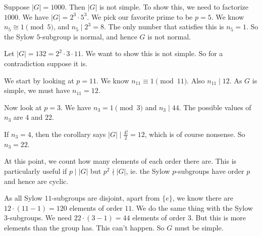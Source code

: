 \documentclass[a4paper]{article}
\begin{document}
\begin{eg}
  Suppose $|G| = 1000$. Then $|G|$ is not simple. To show this, we need to factorize $1000$. We have $|G| = 2^3 \cdot 5^3$. We pick our favorite prime to be $p = 5$. We know $n_5 \cong 1 \pmod 5$, and $n_5 \mid 2^3 = 8$. The only number that satisfies this is $n_5 = 1$. So the Sylow $5$-subgroup is normal, and hence $G$ is not normal.
\end{eg}

\begin{eg}
  Let $|G| = 132 = 2^2 \cdot 3 \cdot 11$. We want to show this is not simple. So for a contradiction suppose it is.

  We start by looking at $p = 11$. We know $n_{11} \equiv 1 \pmod {11}$. Also $n_{11} \mid 12$. As $G$ is simple, we must have $n_{11} = 12$.

  Now look at $p = 3$. We have $n_3 = 1 \pmod 3$ and $n_3 \mid 44$. The possible values of $n_3$ are $4$ and $22$.

  If $n_3 = 4$, then the corollary says $|G| \mid \frac{4!}{2} = 12$, which is of course nonsense. So $n_3 = 22$.

  At this point, we count how many elements of each order there are. This is particularly useful if $p \mid |G|$ but $p^2 \nmid |G|$, ie. the Sylow $p$-subgroups have order $p$ and hence are cyclic.

  As all Sylow $11$-subgroups are disjoint, apart from $\{e\}$, we know there are $12 \cdot (11 - 1) = 120$ elements of order $11$. We do the same thing with the Sylow $3$-subgroups. We need $22 \cdot (3 - 1) = 44$ elements of order $3$. But this is more elements than the group has. This can't happen. So $G$ must be simple.
\end{eg}
\end{document}
